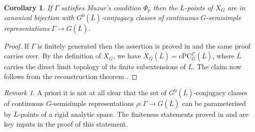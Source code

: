 \documentclass{amsart}
\newtheorem{cor}[prop]{Corollary}
\theoremstyle{definition}
\theoremstyle{remark}
\newtheorem{remar}[prop]{Remark}
\newcommand{\cPC}{\mathrm{cPC}}
\newcommand{\Lbar}{\overline{L}}
\begin{document}
\begin{cor}\label{points_rigid} If $\Gamma$ satisfies Mazur's condition $\Phi_p$ then the $\Lbar$-points
of $X_G$ are in canonical bijection with $G^0(\Lbar)$-conjugacy classes of continuous $G$-semisimple representations $\Gamma\rightarrow G(\Lbar)$.
\end{cor}
\begin{proof} If $\Gamma$ is finitely generated then the assertion 
is proved in \cite[Corollary 6.23]{quast} and the same proof carries over. 
By the definition of $X_G$, we have $X_G(\Lbar) = \cPC^{\Gamma}_G(\Lbar)$, where
$\Lbar$ carries the direct limit topology of its finite subextensions of $L$. The claim now follows from the reconstruction theorem \cite[Theorem 3.8]{quast}.
\end{proof} 

\begin{remar} A priori it is not at all clear that the set of $G^0(\Lbar)$-conjugacy classes of continuous $G$-semisimple representations $\rho:\Gamma\rightarrow G(\Lbar)$
can be parameterised by $\Lbar$-points of a rigid analytic space. The finiteness 
statements proved in  and  are key inputs 
in the proof of this statement. 
\end{remar} 





\end{document}
